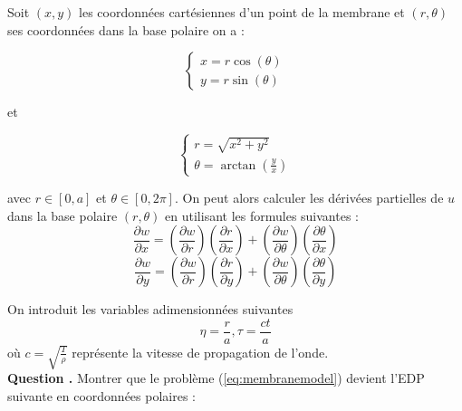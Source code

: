 \documentclass[a4,12pt]{article}
\newcounter{Nbquestion}
\newcommand*\question{%
\stepcounter{Nbquestion}%
\textbf{Question \theNbquestion. }}
\begin{document}
    Soit $(x,y)$ les coordonnées cartésiennes d'un point de la membrane et $(r,\theta)$ ses coordonnées dans la base polaire on a :
    \begin{center}
      \begin{minipage}[l]{.9\linewidth}

	\begin{minipage}[l]{.4\linewidth}
	  \begin{equation*} 
	    \left\{ 
	      \begin{array}{rcl}
		x=r\cos(\theta) \\
		y=r\sin(\theta)
	      \end{array} 
	      \right.
	    \end{equation*}
	  \end{minipage}
	  et
	  \begin{minipage}[r]{.4\linewidth}
	    \begin{equation*} 
	      \left\{ 
		\begin{array}{rcl}
		  r=\sqrt{x^2+y^2} \\
		  \theta=\arctan(\frac{y}{x})
		\end{array} 
		\right.
	      \end{equation*}
	    \end{minipage}

	  \end{minipage}
	\end{center}

	avec $r \in[0,a]$ et $\theta  \in [0,2\pi]$. On peut alors calculer les dérivées partielles de $u$ dans la base polaire $(r,\theta)$ en utilisant les formules suivantes :
	\[
	  \dfrac{\partial w}{\partial x}=\left(\dfrac{\partial w}{\partial r}\right)\left(\dfrac{\partial r}{\partial x}\right)+\left(\dfrac{\partial w}{\partial \theta}\right)\left(\dfrac{\partial \theta}{\partial x}\right)
	\]
	\[
	  \dfrac{\partial w}{\partial y}=\left(\dfrac{\partial w}{\partial r}\right)\left(\dfrac{\partial r}{\partial y}\right)+\left(\dfrac{\partial w}{\partial \theta}\right)\left(\dfrac{\partial \theta}{\partial y}\right)
	\]

	On introduit les variables adimensionnées suivantes 
	\[
	  \eta=\dfrac{r}{a},\tau=\dfrac{ct}{a}
	\]
	où $c=\sqrt{\frac{T}{\rho}}$ représente la vitesse de propagation  de l'onde.\\ 


	\question Montrer que le problème (\ref{eq:membranemodel}) devient l'EDP suivante en coordonnées polaires :\\
\end{document}
